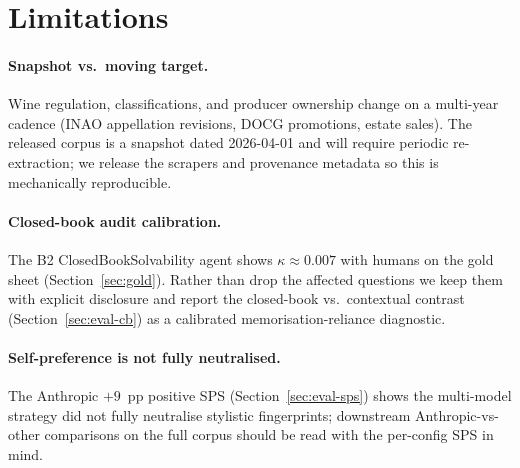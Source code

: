 \section{Limitations}
\label{sec:limitations}

\paragraph{Snapshot vs.\ moving target.} Wine regulation,
classifications, and producer ownership change on a multi-year cadence
(INAO appellation revisions, DOCG promotions, estate sales). The
released corpus is a snapshot dated 2026-04-01 and will require
periodic re-extraction; we release the scrapers and provenance
metadata so this is mechanically reproducible.

\paragraph{Closed-book audit calibration.} The B2 ClosedBookSolvability
agent shows $\kappa\approx0.007$ with humans on the gold sheet
(Section~\ref{sec:gold}). Rather than drop the affected questions we
keep them with explicit disclosure and report the closed-book vs.\
contextual contrast (Section~\ref{sec:eval-cb}) as a calibrated
memorisation-reliance diagnostic.

\paragraph{Self-preference is not fully neutralised.} The Anthropic
$+9$~pp positive SPS (Section~\ref{sec:eval-sps}) shows the
multi-model strategy did not fully neutralise stylistic fingerprints;
downstream Anthropic-vs-other comparisons on the full corpus should
be read with the per-config SPS in mind.

